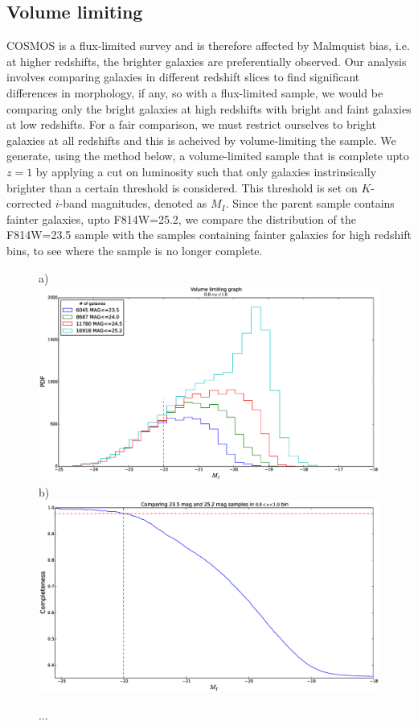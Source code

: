 \documentclass[twocolumn,useAMS,usenatbib]{mn2e}
\newcommand{\rachel}[1]{{\textcolor{red}{#1}}}
\begin{document}
\subsection{Volume limiting}
\label{sub:volumelimiting}
COSMOS is a flux-limited survey and is therefore affected by Malmquist bias, i.e. at higher redshifts, the brighter galaxies are preferentially observed.
Our analysis involves comparing galaxies in different redshift slices to find significant differences in morphology, if any, so with a flux-limited sample, we would be comparing only the bright galaxies at high redshifts with
bright and faint galaxies at low redshifts. For a fair comparison, we must restrict ourselves to bright galaxies at all redshifts and this is acheived by volume-limiting the sample.
We generate, using the method below, a volume-limited sample that is complete upto $z=1$ by applying a cut on luminosity such that only galaxies instrinsically brighter than a certain threshold is considered. This threshold is set on $K$-corrected $i$-band magnitudes, denoted as $M_I$.
Since the parent sample contains fainter galaxies, upto F814W=25.2, we compare the distribution of the F814W=23.5 sample with the samples containing fainter galaxies for high redshift bins, to see where the sample is no longer complete.
\begin{figure}
 \centering
 a) \includegraphics[width=\columnwidth]{volume_limiting_pdf}
 b) \includegraphics[width=\columnwidth]{volume_limiting_cdf}
 \label{fig:volume_limiting_dist}
 \caption{ ... }
\end{figure}
\end{document}
